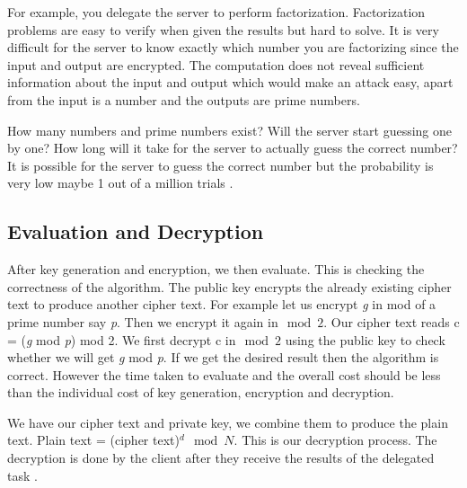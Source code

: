 For example, you delegate the server to perform factorization. Factorization problems are easy to verify when given the results but hard to solve. It is very difficult for the server to know exactly which number you are factorizing since the input and output are encrypted. The computation does not reveal sufficient information about the input and output which would make an attack easy, apart from the input is a number and the outputs are prime numbers.

How many numbers and prime numbers exist? Will the server start guessing one by one? How long will it take for the server to actually guess the  correct number? It is possible for the server to guess the correct number but the probability is very low maybe 1 out of a million trials \citep{yang2013evaluation}.

\subsection{Evaluation and Decryption}
After key generation and encryption, we then evaluate. This is checking the correctness of the algorithm. The public key encrypts the already existing cipher text to produce another cipher text. For example let us encrypt \textit{g} in mod of a prime number say \textit{p}. Then we encrypt it again in$\mod 2$. Our cipher text reads c = (\textit{g} mod \textit{p}) mod 2. We first decrypt c in$\mod 2$ using the public key to check whether we will get \textit{g} mod \textit{p}. If we get the desired result then the algorithm is correct.  However the time taken to evaluate and the overall cost should be less than the individual cost of key generation, encryption and decryption. 

We have our cipher text and private key, we combine them to produce the plain text. Plain text = (cipher text)$^d \mod N$. This is our decryption process. The decryption  is done by the client after they receive the results of the delegated task \citep{ouyang2015quantum}.



